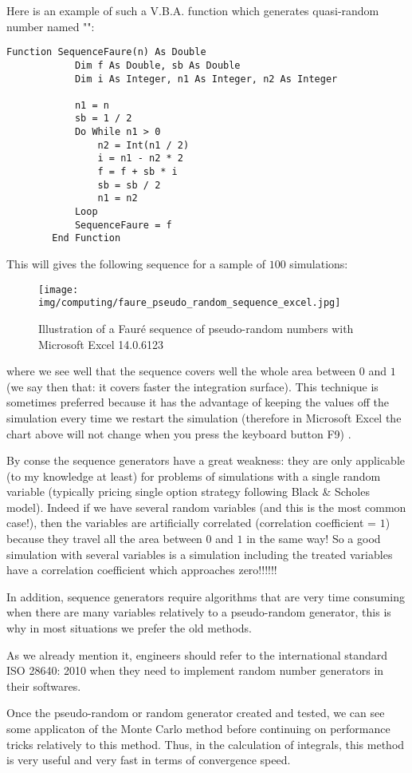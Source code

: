 	Here is an example of such a V.B.A. function which generates quasi-random number named "":
	
	\begin{lstlisting}[language={[Visual]Basic}, caption={VBA Fauré sequence code}]
		Function SequenceFaure(n) As Double
    		Dim f As Double, sb As Double
    		Dim i As Integer, n1 As Integer, n2 As Integer
    
    		n1 = n
    		sb = 1 / 2
    		Do While n1 > 0
		        n2 = Int(n1 / 2)
		        i = n1 - n2 * 2
		        f = f + sb * i
		        sb = sb / 2
		        n1 = n2
		    Loop
		    SequenceFaure = f
		End Function
	\end{lstlisting}
	This will gives the following sequence for a sample of $100$ simulations:
	\begin{figure}[H]
		\centering
		\texttt{[image: img/computing/faure\_pseudo\_random\_sequence\_excel.jpg]}
		\caption[]{Illustration of a Fauré sequence of pseudo-random numbers with Microsoft Excel 14.0.6123}
	\end{figure}
	where we see well that the sequence covers well the whole area between $0$ and $1$ (we say then that: it covers faster the integration surface). This technique is sometimes preferred because it has the advantage of keeping the values off the simulation every time we restart the simulation (therefore in Microsoft Excel the chart above will not change when you press the keyboard button F9) .

	By conse the sequence generators have a great weakness: they are only applicable (to my knowledge at least) for problems of simulations with a single random variable (typically pricing single option strategy following Black \& Scholes model). Indeed if we have several random variables (and this is the most common case!), then the variables are artificially correlated (correlation coefficient = $1$) because they travel all the area between $0$ and $1$ in the same way! So a good simulation with several variables is a simulation including the treated variables have a correlation coefficient which approaches zero!!!!!!

	In addition, sequence generators require algorithms that are very time consuming when there are many variables relatively to a pseudo-random generator, this is why in most situations we prefer the old methods.
	\begin{tcolorbox}[title=Remark,colframe=black,arc=10pt]
	As we already mention it, engineers should refer to the international standard ISO 28640: 2010 when they need to implement random number generators in their softwares.
	\end{tcolorbox}
	Once the pseudo-random or random generator created and tested, we can see some applicaton of the Monte Carlo method before continuing on performance tricks relatively to this method. Thus, in the calculation of integrals, this method is very useful and very fast in terms of convergence speed.
	
